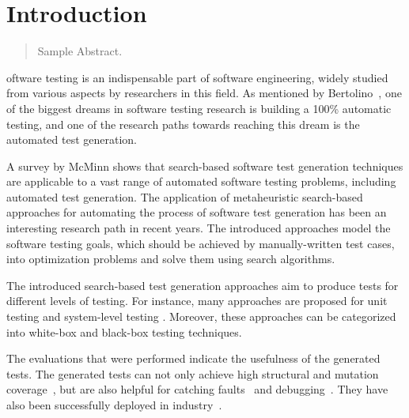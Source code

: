 \chapter{Introduction}
\label{introduction}

\begin{abstract}
Sample Abstract. 
\end{abstract}



\newpage
{}oftware testing is an indispensable part of software engineering, widely studied from various aspects by researchers in this field. As mentioned by Bertolino~\cite{bertolino2007software}, one of the biggest dreams in software testing research is building a 100\% automatic testing, and one of the research paths towards reaching this dream is the automated test generation.

A survey by McMinn \cite{McMinn2004} shows that search-based software test generation techniques are applicable to a vast range of automated software testing problems, including automated test generation. The application of metaheuristic search-based approaches for automating the process of software test generation has been an interesting research path in recent years. The introduced approaches model the software testing goals, which should be achieved by manually-written test cases, into optimization problems and solve them using search algorithms. 

The introduced search-based test generation approaches aim to produce tests for different levels of testing. For instance, many approaches are proposed for unit testing \cite{Fraser2011, braione2017tardis, braione2018sushi, prasetya2013t3} and system-level testing \cite{Arcuri2019, Holler2012, Padhye2019, beyene2012, coppit2005, godefroid2008}. Moreover, these approaches can be categorized into white-box \cite{Fraser2011, braione2017tardis, braione2018sushi, prasetya2013t3, Arcuri2019} and black-box \cite{Holler2012, Padhye2019, beyene2012, coppit2005, godefroid2008} testing techniques. 

The evaluations that were performed indicate the usefulness of the generated tests. The generated tests can not only achieve high structural and mutation coverage~\cite{Panichella2018a, Fraser2014b}, but are also helpful for catching faults~\cite{Shamshiri2016} and debugging~\cite{Ceccato2015}. They have also been successfully deployed in industry~\cite{Alshahwan2018, almasi2017industrial}.

